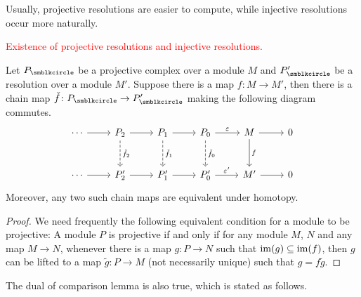 Usually, projective resolutions are easier to compute, while injective resolutions occur more naturally.

\textcolor{red}{Existence of projective resolutions and injective resolutions.}

\begin{lemma}
  Let $P_\CCCIR$ be a projective complex over a module $M$ and $P_\CCCIR'$ be a resolution over a module $M'$. Suppose there is a map $f\colon M\to M'$, then there is a chain map $\check f\colon P_\CCCIR\to P_\CCCIR'$ making the following diagram commutes.
  \begin{equation*}
    \begin{tikzcd}[row sep=large]
      \dotsb & P_2 & P_1 & P_0 & M & 0\\
      \dotsb & P_2' & P_1' & P_0' & M' & 0
      \arrow[from=1-1,]{1-2}[]{}
      \arrow[from=1-2,]{1-3}[]{}
      \arrow[from=1-3,]{1-4}[]{}
      \arrow[from=1-4,]{1-5}[]{\varepsilon}
      \arrow[from=1-5,]{1-6}[]{}
      \arrow[from=2-1,]{2-2}[]{}
      \arrow[from=2-2,]{2-3}[]{}
      \arrow[from=2-3,]{2-4}[]{}
      \arrow[from=2-4,]{2-5}[]{\varepsilon'}
      \arrow[from=2-5,]{2-6}[]{}
      \arrow[from=1-2,dashed,]{2-2}[]{\check{f}_2}
      \arrow[from=1-3,dashed,]{2-3}[]{\check{f}_1}
      \arrow[from=1-4,dashed,]{2-4}[]{\check{f}_0}
      \arrow[from=1-5,]{2-5}[]{f}
    \end{tikzcd}
  \end{equation*}
  Moreover, any two such chain maps are equivalent under homotopy.
\end{lemma}

\begin{proof}
  We need frequently the following equivalent condition for a module to be projective: A module $P$ is projective if and only if for any module $M$, $N$ and any map $M\to N$, whenever there is a map $g\colon P\to N$ such that $\operatorname{im}(g)\subseteq\operatorname{im}(f)$, then $g$ can be lifted to a map $\tilde g\colon P\to M$ (not necessarily unique) such that $g=f\tilde g$.
\end{proof}

The dual of comparison lemma is also true, which is stated as follows.

